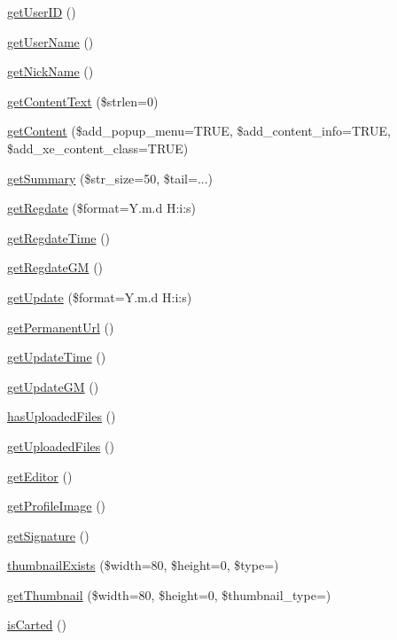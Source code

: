 \begin{DoxyCompactItemize}
\hyperlink{classcommentItem_a5c793e6542e731da5d465c35c77b42fd}{get\+User\+ID} ()
\item 
\hyperlink{classcommentItem_a1c35032d37e80ad5018a02787f0091fe}{get\+User\+Name} ()
\item 
\hyperlink{classcommentItem_a097673677cd1c461040cbc9275b7fca9}{get\+Nick\+Name} ()
\item 
\hyperlink{classcommentItem_a5bd758e385068bff00ffc35a0737ff72}{get\+Content\+Text} (\$strlen=0)
\item 
\hyperlink{classcommentItem_afae7151c28cc9066f9c40a010597b25a}{get\+Content} (\$add\+\_\+popup\+\_\+menu=T\+R\+UE, \$add\+\_\+content\+\_\+info=T\+R\+UE, \$add\+\_\+xe\+\_\+content\+\_\+class=T\+R\+UE)
\item 
\hyperlink{classcommentItem_a3705efbd1d15d8defc8e4ec371daf01b}{get\+Summary} (\$str\+\_\+size=50, \$tail=\textquotesingle{}...\textquotesingle{})
\item 
\hyperlink{classcommentItem_ac20123f19deb94ad33a26366195b2477}{get\+Regdate} (\$format=\textquotesingle{}Y.\+m.\+d H\+:i\+:s\textquotesingle{})
\item 
\hyperlink{classcommentItem_adb5754f10a245c54a0beb4f6fb22f0e3}{get\+Regdate\+Time} ()
\item 
\hyperlink{classcommentItem_ae5f0203691b6d16a2d99ae40d67adb3f}{get\+Regdate\+GM} ()
\item 
\hyperlink{classcommentItem_a688fe6f0328ed3f28f72104943d5c335}{get\+Update} (\$format=\textquotesingle{}Y.\+m.\+d H\+:i\+:s\textquotesingle{})
\item 
\hyperlink{classcommentItem_adc6e6a36fd7c02a2f0fecc8a22f9b13b}{get\+Permanent\+Url} ()
\item 
\hyperlink{classcommentItem_a59d0264c1b6842c6a0dfa21a6dfe1edb}{get\+Update\+Time} ()
\item 
\hyperlink{classcommentItem_aab0135e2edd37a47cc390da9b4c79dfa}{get\+Update\+GM} ()
\item 
\hyperlink{classcommentItem_abe1774ffe4e8c0f5c14822c5698433da}{has\+Uploaded\+Files} ()
\item 
\hyperlink{classcommentItem_aaa9c1ef5cfd0ce69fd83d8d980360ee5}{get\+Uploaded\+Files} ()
\item 
\hyperlink{classcommentItem_aa27b1c1916b9df510c495655af07bfdf}{get\+Editor} ()
\item 
\hyperlink{classcommentItem_a9baa56f4aa9515c433494778e75c9e85}{get\+Profile\+Image} ()
\item 
\hyperlink{classcommentItem_a97eea3e5359c0ffe84db781d5e5fbff6}{get\+Signature} ()
\item 
\hyperlink{classcommentItem_a84c136587ab96499809c4df053d21e9e}{thumbnail\+Exists} (\$width=80, \$height=0, \$type=\textquotesingle{}\textquotesingle{})
\item 
\hyperlink{classcommentItem_a4a4175f24e633332e57bdada6f75ffdf}{get\+Thumbnail} (\$width=80, \$height=0, \$thumbnail\+\_\+type=\textquotesingle{}\textquotesingle{})
\item 
\hyperlink{classcommentItem_aee548a05480bd060de454017aa8be318}{is\+Carted} ()
\end{DoxyCompactItemize}
